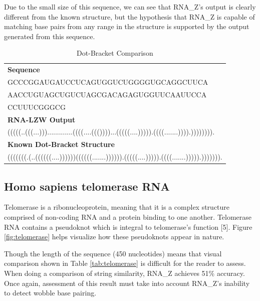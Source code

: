 \documentclass[sigconf]{acmart}
\begin{document}
Due to the small size of this sequence, we can see that RNA\_Z's output is clearly different from the known structure, but the hypothesis that RNA\_Z is capable of matching base pairs from any range in the structure is supported by the output generated from this sequence. 

\begin{table}
  \caption{Dot-Bracket Comparison}
  \label{tab:tRNA}
  \begin{tabular}{l}
    \textbf{Sequence}\\
    GCCCGGAUGAUCCUCAGUGGUCUGGGGUGCAGGCUUCA\\
    AACCUGUAGCUGUCUAGCGACAGAGUGGUUCAAUUCCA\\
    CCUUUCGGGCG\\
    \midrule
    \textbf{RNA-LZW Output}\\
	(((((..(((...))).............((((....((())))...(((((....))))).((((.......)))).)))))))).\\
    \midrule 
    \textbf{Known Dot-Bracket Structure}\\
    (((((((.(..((((((....))))))((((((.......)))))).(((((....))))).((((.......))))).))))))).\\
\end{tabular}
\end{table}


\subsection{Homo sapiens telomerase RNA}

Telomerase is a ribonucleoprotein, meaning that it is a complex structure comprised of non-coding RNA and a protein binding to one another. Telomerase RNA contains a pseudoknot which is integral to telomerase's function [5].  Figure \ref{fig:telomerase} helps visualize how these pseudoknots appear in nature.

Though the length of the sequence (450 nucleotides) means that visual comparison shown in Table \ref{tab:telomerase} is difficult for the reader to assess. When doing a comparison of string similarity, RNA\_Z achieves 51\% accuracy. Once again, assessment of this result must take into account RNA\_Z's inability to detect wobble base pairing. 
\end{document}
